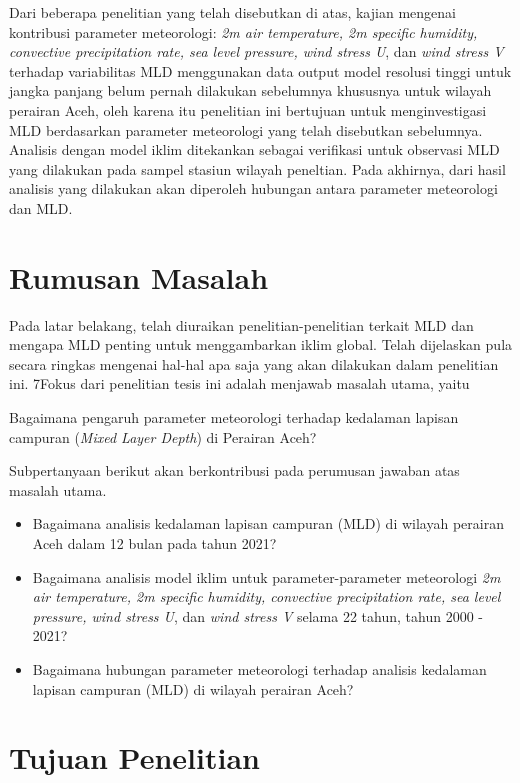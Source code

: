 \begin{spacing}{1.5}
	Dari beberapa penelitian yang telah disebutkan di atas, kajian mengenai kontribusi parameter meteorologi: \textit{2m air temperature, 2m specific humidity, convective precipitation rate, sea level pressure, wind stress U}, dan \textit{wind stress V} terhadap variabilitas MLD menggunakan data output model resolusi tinggi untuk jangka panjang belum pernah dilakukan sebelumnya khususnya untuk wilayah perairan Aceh, oleh karena itu penelitian ini bertujuan untuk menginvestigasi MLD berdasarkan parameter meteorologi yang telah disebutkan sebelumnya. Analisis dengan model iklim ditekankan sebagai verifikasi untuk observasi MLD yang dilakukan pada sampel stasiun wilayah peneltian. Pada akhirnya, dari hasil analisis yang dilakukan akan diperoleh hubungan antara parameter meteorologi dan MLD.
	
	\section[Rumusan Masalah]{Rumusan Masalah}
	Pada latar belakang, telah diuraikan penelitian-penelitian terkait MLD dan mengapa MLD penting untuk menggambarkan iklim global. Telah dijelaskan pula secara ringkas mengenai hal-hal apa saja yang akan dilakukan dalam penelitian ini. 7Fokus dari penelitian tesis ini adalah menjawab masalah utama, yaitu
	
	Bagaimana pengaruh parameter meteorologi terhadap kedalaman lapisan campuran (\textit{Mixed Layer Depth}) di Perairan Aceh?
	
	Subpertanyaan berikut akan berkontribusi pada perumusan jawaban atas masalah utama.
	\begin{itemize}
		\item Bagaimana analisis kedalaman lapisan campuran (MLD) di wilayah perairan Aceh dalam 12 bulan pada tahun 2021? 
		\item Bagaimana analisis model iklim untuk parameter-parameter meteorologi \textit{2m air temperature, 2m specific humidity, convective precipitation rate, sea level pressure, wind stress U}, dan \textit{wind stress V} selama 22 tahun, tahun 2000 - 2021?
		\item Bagaimana hubungan parameter meteorologi terhadap analisis kedalaman lapisan campuran (MLD) di wilayah perairan Aceh?
	\end{itemize}
	\section[Tujuan Penelitian]{Tujuan Penelitian}
	

\end{spacing}

